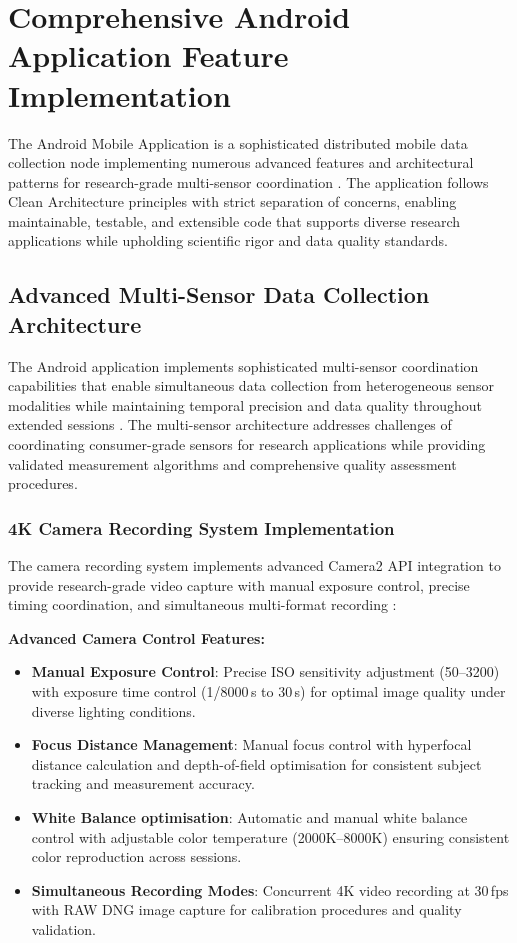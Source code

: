 \documentclass[11pt,a4paper]{report}
\begin{document}
\section{Comprehensive Android Application Feature Implementation}

The Android Mobile Application is a sophisticated distributed mobile data collection node implementing numerous advanced features and architectural patterns for research-grade multi-sensor coordination \cite{bucika2024repo}. The application follows Clean Architecture principles with strict separation of concerns, enabling maintainable, testable, and extensible code that supports diverse research applications while upholding scientific rigor and data quality standards.

\subsection{Advanced Multi-Sensor Data Collection Architecture}

The Android application implements sophisticated multi-sensor coordination capabilities that enable simultaneous data collection from heterogeneous sensor modalities while maintaining temporal precision and data quality throughout extended sessions \cite{ShimmerSDK2024}. The multi-sensor architecture addresses challenges of coordinating consumer-grade sensors for research applications while providing validated measurement algorithms and comprehensive quality assessment procedures.

\subsubsection{4K Camera Recording System Implementation}

The camera recording system implements advanced Camera2 API integration to provide research-grade video capture with manual exposure control, precise timing coordination, and simultaneous multi-format recording \cite{AndroidGuide2024}\cite{AndroidRef2024}:

\textbf{Advanced Camera Control Features:}
\begin{itemize}
  \item \textbf{Manual Exposure Control}: Precise ISO sensitivity adjustment (50–3200) with exposure time control (1/8000\,s to 30\,s) for optimal image quality under diverse lighting conditions.
  \item \textbf{Focus Distance Management}: Manual focus control with hyperfocal distance calculation and depth-of-field optimisation for consistent subject tracking and measurement accuracy.
  \item \textbf{White Balance optimisation}: Automatic and manual white balance control with adjustable color temperature (2000K–8000K) ensuring consistent color reproduction across sessions.
  \item \textbf{Simultaneous Recording Modes}: Concurrent 4K video recording at 30\,fps with RAW DNG image capture for calibration procedures and quality validation.
\end{itemize}
\end{document}
